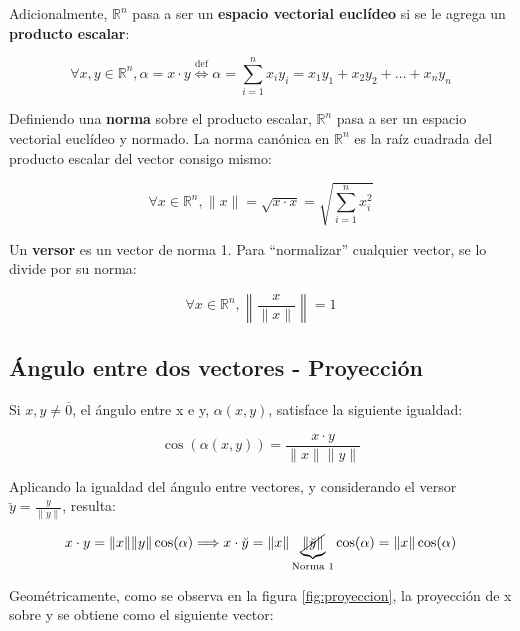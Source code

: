 \documentclass{article}
\renewcommand{\Bbb}{\mathbb}
\begin{document}
Adicionalmente, $\Bbb R^n$ pasa a ser un \textbf{espacio vectorial euclídeo} si se le agrega un \textbf{producto escalar}:

\begin{equation}
\forall x, y \in \Bbb R^n, \alpha = x \cdot y \overset{\text{def}}{\Longleftrightarrow} \alpha = \sum\limits_{i=1}^{n} x_i y_i = x_1 y_1 + x_2 y_2 + \ldots + x_n y_n
\end{equation}

Definiendo una \textbf{norma} sobre el producto escalar, $\Bbb R^n$ pasa a ser un espacio vectorial euclídeo y normado. La norma canónica en $\Bbb R^n$ es la raíz cuadrada del producto escalar del vector consigo mismo:

\begin{equation}
\forall x \in \Bbb R^n, \|x\| = \sqrt{x \cdot x} = \sqrt{ \sum\limits_{i=1}^{n} x_i^2 }
\end{equation}

Un \textbf{versor} es un vector de norma 1. Para ``normalizar'' cualquier vector, se lo divide por su norma:

\begin{equation}
\forall x \in \Bbb R^n, \left\| \frac{x}{\|x\|} \right\| = 1
\end{equation}

\subsection{Ángulo entre dos vectores - Proyección}

Si $x, y \neq \overline{0}$, el ángulo entre x e y, $\alpha(x,y)$, satisface la siguiente igualdad:

\begin{equation}
\cos (\alpha(x, y)) = \frac{x \cdot y}{ \|x\| \|y\| }
\end{equation}

Aplicando la igualdad del ángulo entre vectores, y considerando el versor $\breve{y} = \frac{y}{\|y\|}$, resulta:

\begin{equation}
x \cdot y = \|x\| \|y\| \cos(\alpha) \Longrightarrow x \cdot \breve{y} = \|x\| \underbrace{ \cancel{ \| \breve{y} \| } }_{\text{Norma 1}} \cos(\alpha) = \|x\| \cos(\alpha)
\end{equation}

Geométricamente, como se observa en la figura \ref{fig:proyeccion}, la proyección de x sobre y se obtiene como el siguiente vector:
\end{document}
